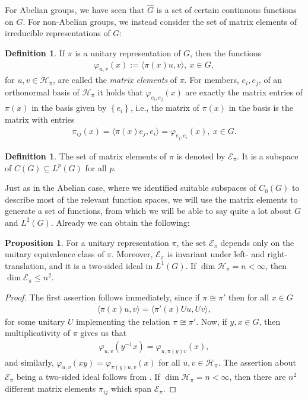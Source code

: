 \documentclass[10pt,twoside,openany,final]{memoir}
\theoremstyle{definition}
\newtheorem{proposition}[theorem]{Proposition}
\newtheorem{definition}[theorem]{Definition}
\theoremstyle{Break}
\newcommand{\G}{\widehat{G}}
\renewcommand{\H}{\mathcal{H}}
\begin{document}
For Abelian groups, we have seen that $\G$ is a set of certain continuous functions on $G$. For non-Abelian groups, we instead consider the set of matrix elements of irreducible representations of $G$:
\begin{definition}
	If $\pi$ is a unitary representation of $G$, then the functions
	\begin{align*}
		\varphi_{u,v}(x) := \langle \pi(x) u,v \rangle,\ x \in G,
	\end{align*}
	for $u,v \in \H_\pi$, are called the \emph{matrix elements} of $\pi$. For members, $e_i , e_j$, of an orthonormal basis of $\H_\pi$ it holds that $ \varphi_{e_i,e_j}(x)$ are exactly the matrix entries of $\pi(x)$ in the basis given by $\left\{ e_i \right\}$, i.e., the matrix of $\pi(x)$ in the basis is the matrix with entries
	\begin{align*}
		\pi_{ij}(x) = \langle \pi(x) e_j , e_i \rangle = \varphi_{e_j,e_i}(x), \ x \in G.
	\end{align*}
\end{definition}
\begin{definition}
	The set of matrix elements of $\pi$ is denoted by $\mathcal{E}_\pi$. It is a subspace of $C(G)\subseteq L^p(G)$ for all $p$.
\end{definition}
Just as in the Abelian case, where we identified suitable subspaces of $C_0(G)$ to describe most of the relevant function spaces, we will use the matrix elements to generate a set of functions, from which we will be able to say quite a lot about $G$ and $L^2(G)$. Already we can obtain the following:
\begin{proposition}
	For a unitary representation $\pi$, the set $\mathcal{E}_\pi$ depends only on the unitary equivalence class of $\pi$. Moreover, $\mathcal{E}_\pi$ is invariant under left- and right-translation, and it is a two-sided ideal in $L^1(G)$. If $\dim \H_\pi = n < \infty$, then $\dim \mathcal{E}_\pi \leq n^2$.
	\label{5.6}
\end{proposition}
\begin{proof}
The first assertion follows immediately, since if $\pi \cong \pi'$ then for all $x \in G$
\begin{align*}
	\langle \pi(x) u,v \rangle = \langle \pi'(x) U u , Uv\rangle,
\end{align*}
for some unitary $U$ implementing the relation $\pi \cong \pi'$. Now, if $y,x \in G$, then multiplicativity of $\pi$ gives us that
\begin{align*}
	\varphi_{u,v}(y^{-1}x) = \varphi_{u,\pi(y)v}(x),
\end{align*}
and similarly, $\varphi_{u,v}(xy)=\varphi_{\pi(y)u,v}(x)$ for all $u,v \in \H_\pi$. The assertion about $\mathcal{E}_\pi$ being a two-sided ideal follows from . If $\dim \H_\pi=n < \infty$, then there are $n^2$ different matrix elements $\pi_{ij}$ which span $\mathcal{E}_\pi$.
\end{proof}
\end{document}
